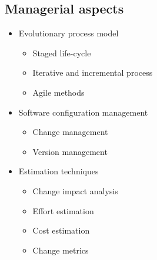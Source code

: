 \documentclass[a4paper,11pt]{report}
\begin{document}
	\subsection{Managerial aspects}
		\begin{itemize}
			\item Evolutionary process model
				\begin{itemize}	
					\item Staged life-cycle
					\item Iterative and incremental 
						process
					\item Agile methods
				\end{itemize}
			\item Software configuration management
				\begin{itemize}
					\item Change management
					\item Version management
				\end{itemize}
			\item Estimation techniques
				\begin{itemize}	
					\item Change impact analysis
					\item Effort estimation
					\item Cost estimation
					\item Change metrics
				\end{itemize}
		\end{itemize}
%
\newpage
%
\end{document}
